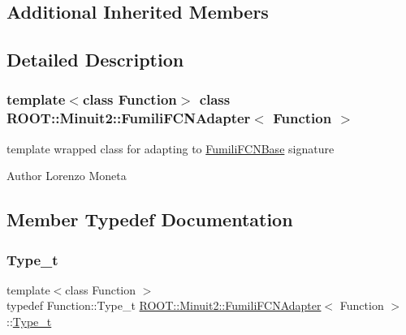 \subsection*{Additional Inherited Members}


\subsection{Detailed Description}
\subsubsection*{template$<$class Function$>$\newline
class R\+O\+O\+T\+::\+Minuit2\+::\+Fumili\+F\+C\+N\+Adapter$<$ Function $>$}

template wrapped class for adapting to \mbox{\hyperlink{classROOT_1_1Minuit2_1_1FumiliFCNBase}{Fumili\+F\+C\+N\+Base}} signature

\begin{DoxyAuthor}{Author}
Lorenzo Moneta 
\end{DoxyAuthor}


\subsection{Member Typedef Documentation}
\mbox{\label{classROOT_1_1Minuit2_1_1FumiliFCNAdapter_afce33892c378fb82c3209eda03824e11}} 
\subsubsection{\texorpdfstring{Type\_t}{Type\_t}\hspace{0.1cm}{\footnotesize\ttfamily [1/3]}}
{\footnotesize\ttfamily template$<$class Function $>$ \\
typedef Function\+::\+Type\+\_\+t \mbox{\hyperlink{classROOT_1_1Minuit2_1_1FumiliFCNAdapter}{R\+O\+O\+T\+::\+Minuit2\+::\+Fumili\+F\+C\+N\+Adapter}}$<$ Function $>$\+::\mbox{\hyperlink{classROOT_1_1Minuit2_1_1FumiliFCNAdapter_afce33892c378fb82c3209eda03824e11}{Type\+\_\+t}}}

\mbox{\label{classROOT_1_1Minuit2_1_1FumiliFCNAdapter_afce33892c378fb82c3209eda03824e11}} 
